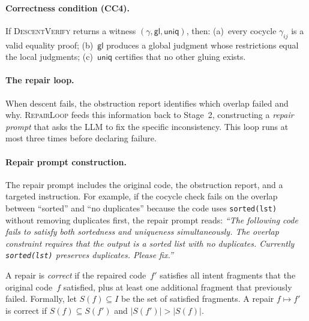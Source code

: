 \documentclass[11pt]{article}
\newcommand{\Cocycle}{\gamma}
\newcommand{\GlueMap}{\mathsf{gl}}
\newcommand{\UniqWit}{\mathsf{uniq}}
\newcommand{\DescentVerify}{\textsc{DescentVerify}}
\newcommand{\RepairLoop}{\textsc{RepairLoop}}
\begin{document}
\paragraph{Correctness condition (CC4).}
If \DescentVerify{} returns a witness $(\Cocycle, \GlueMap, \UniqWit)$,
then:
(a)~every cocycle $\Cocycle_{ij}$ is a valid equality proof;
(b)~$\GlueMap$ produces a global judgment whose restrictions equal the
local judgments; (c)~$\UniqWit$ certifies that no other gluing exists.

\paragraph{The repair loop.}
When descent fails, the obstruction report identifies which overlap
failed and why.  \RepairLoop{} feeds this information back to
Stage~2, constructing a \emph{repair prompt} that asks the LLM to
fix the specific inconsistency.  This loop runs at most three times
before declaring failure.

\paragraph{Repair prompt construction.}
The repair prompt includes the original code, the obstruction report,
and a targeted instruction.  For example, if the cocycle check fails on
the overlap between ``sorted'' and ``no duplicates'' because the code
uses \texttt{sorted(lst)} without removing duplicates first, the repair
prompt reads: \emph{``The following code fails to satisfy both
sortedness and uniqueness simultaneously.  The overlap constraint
requires that the output is a sorted list with no duplicates.
Currently \texttt{sorted(lst)} preserves duplicates.  Please fix.''}

\begin{definition}\label{def:repair-correct}
A repair is \emph{correct} if the repaired code~$f'$ satisfies all
intent fragments that the original code~$f$ satisfied, plus at least
one additional fragment that previously failed.  Formally, let
$S(f) \subseteq I$ be the set of satisfied fragments.  A repair
$f \mapsto f'$ is correct if $S(f) \subseteq S(f')$ and
$|S(f')| > |S(f)|$.
\end{definition}
\end{document}
